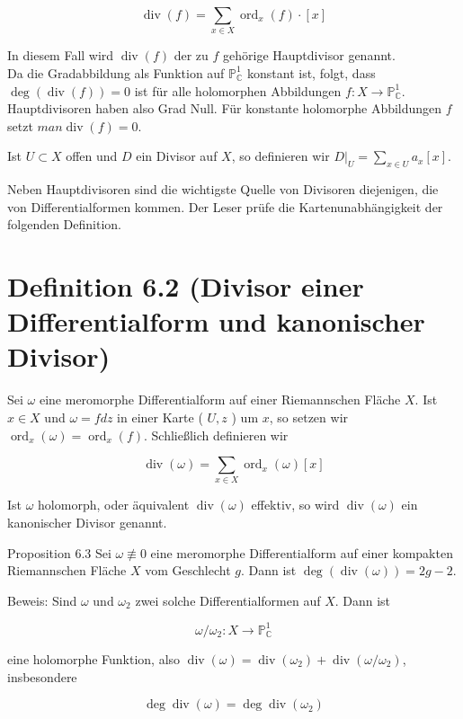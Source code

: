 \documentclass[10pt, letterpaper]{article}
\begin{document}
$$
\operatorname{div}(f)=\sum_{x \in X} \operatorname{ord}_{x}(f) \cdot[x]
$$

In diesem Fall wird $\operatorname{div}(f)$ der zu $f$ gehörige Hauptdivisor genannt.\\
Da die Gradabbildung als Funktion auf $\mathbb{P}_{\mathbb{C}}^{1}$ konstant ist, folgt, dass $\operatorname{deg}(\operatorname{div}(f))=0$ ist für alle holomorphen Abbildungen $f: X \longrightarrow \mathbb{P}_{\mathbb{C}}^{1}$. Hauptdivisoren haben also Grad Null. Für konstante holomorphe Abbildungen $f$ setzt $m a n \operatorname{div}(f)=0$.

Ist $U \subset X$ offen und $D$ ein Divisor auf $X$, so definieren wir $\left.D\right|_{U}= \sum_{x \in U} a_{x}[x]$.

Neben Hauptdivisoren sind die wichtigste Quelle von Divisoren diejenigen, die von Differentialformen kommen. Der Leser prüfe die Kartenunabhängigkeit der folgenden Definition.

\section {Definition 6.2 (Divisor einer Differentialform und kanonischer Divisor)}
Sei $\omega$ eine meromorphe Differentialform auf einer Riemannschen Fläche $X$. Ist $x \in X$ und $\omega=f d z$ in einer Karte ( $U, z$ ) um $x$, so setzen wir $\operatorname{ord}_{x}(\omega)=\operatorname{ord}_{x}(f)$. Schließlich definieren wir

$$
\operatorname{div}(\omega)=\sum_{x \in X} \operatorname{ord}_{x}(\omega)[x]
$$

Ist $\omega$ holomorph, oder äquivalent $\operatorname{div}(\omega)$ effektiv, so wird $\operatorname{div}(\omega)$ ein kanonischer Divisor genannt.

Proposition 6.3 Sei $\omega \not \equiv 0$ eine meromorphe Differentialform auf einer kompakten Riemannschen Fläche $X$ vom Geschlecht $g$. Dann ist $\operatorname{deg}(\operatorname{div}(\omega))=2 g-2$.

Beweis: Sind $\omega$ und $\omega_{2}$ zwei solche Differentialformen auf $X$. Dann ist

$$
\omega / \omega_{2}: X \longrightarrow \mathbb{P}_{\mathbb{C}}^{1}
$$

eine holomorphe Funktion, also $\operatorname{div}(\omega)=\operatorname{div}\left(\omega_{2}\right)+\operatorname{div}\left(\omega / \omega_{2}\right)$, insbesondere

$$
\operatorname{deg} \operatorname{div}(\omega)=\operatorname{deg} \operatorname{div}\left(\omega_{2}\right)
$$
\end{document}
